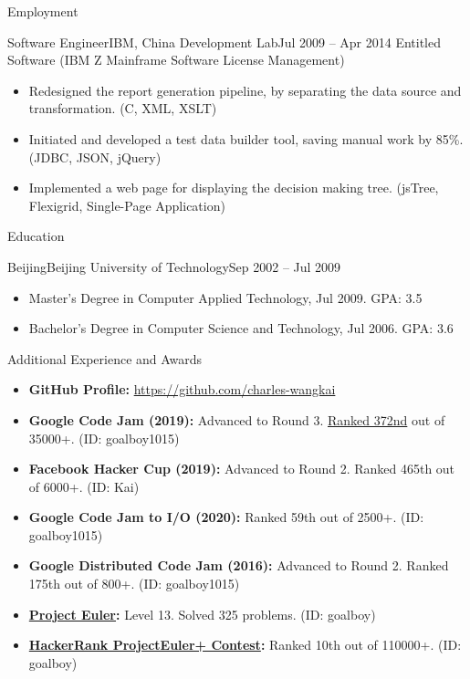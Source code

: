 \documentclass[]{mcdowellcv}
\begin{document}
\begin{cvsection}{Employment}
		\begin{cvsubsection}{Software Engineer}{IBM, China Development Lab}{Jul 2009 – Apr 2014}
			Entitled Software (IBM Z Mainframe Software License Management)
			\begin{itemize}
				\item Redesigned the report generation pipeline, by separating the data source and transformation. (C, XML, XSLT)
				\item Initiated and developed a test data builder tool, saving manual work by 85\%. (JDBC, JSON, jQuery)
				\item Implemented a web page for displaying the decision making tree. (jsTree, Flexigrid, Single-Page Application)
			\end{itemize}
		\end{cvsubsection}
	\end{cvsection}
	
	\begin{cvsection}{Education}
		\begin{cvsubsection}{Beijing}{Beijing University of Technology}{Sep 2002 – Jul 2009}
			\begin{itemize}
				\item Master's Degree in Computer Applied Technology, Jul 2009. GPA: 3.5
				\item Bachelor's Degree in Computer Science and Technology, Jul 2006. GPA: 3.6
			\end{itemize}
		\end{cvsubsection}
	\end{cvsection}
	
	\begin{cvsection}{Additional Experience and Awards}
		\begin{cvsubsection}{}{}{}
			\begin{itemize}
				\item \textbf{GitHub Profile:} \url{https://github.com/charles-wangkai}
				\item \textbf{Google Code Jam (2019):} Advanced to Round 3. {\href{http://charles-wangkai.github.io/certificates/certificate_google_code_jam_2019.pdf}{Ranked 372nd}} out of 35000+. (ID: goalboy1015)
				\item \textbf{Facebook Hacker Cup (2019):} Advanced to Round 2. Ranked 465th out of 6000+. (ID: Kai)
				\item \textbf{Google Code Jam to I/O (2020):} Ranked 59th out of 2500+. (ID: goalboy1015)
				\item \textbf{Google Distributed Code Jam (2016):} Advanced to Round 2. Ranked 175th out of 800+. (ID: goalboy1015)
				\item \textbf{\href{https://projecteuler.net}{Project Euler}:} Level 13. Solved 325 problems. (ID: goalboy)
				\item \textbf{\href{https://www.hackerrank.com/projecteuler}{HackerRank ProjectEuler+ Contest}:} Ranked 10th out of 110000+. (ID: goalboy)
			\end{itemize}
		\end{cvsubsection}
	\end{cvsection}
	
\end{document}
